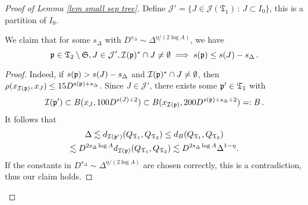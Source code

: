\begin{proof}[Proof of Lemma \ref{lem small sep tree}]
    Define $\mathcal{J}' = \{J \in \mathcal{J}(\mathfrak{T}_1) \, : \, J \subset I_0\}$, this is a partition of $I_0$.

    \begin{lemma}
        \label{lem sep aux 3}
        We claim that for some $s_\Delta$ with $D^{s_\Delta}\sim \Delta^{\eta/(2 \log A)}$, we have
        \begin{equation}
            \label{SepTreeClaim}
            \mathfrak p \in \mathfrak{T}_2 \setminus \mathfrak{S}, J \in \mathcal{J}', \mathcal{I}(\mathfrak p)^* \cap J \neq \emptyset \implies s(\mathfrak p) \leq s(J) - s_\Delta\,.
        \end{equation}
    \end{lemma}

    \begin{proof}
        Indeed, if $s(\mathfrak p) > s(J) - s_\Delta$ and $\mathcal{I}(\mathfrak p)^* \cap J \neq \emptyset$, then $\rho(x_{\mathcal{I}(\mathfrak p)}, x_J) \leq 15 D^{s(\mathfrak p) + s_\Delta}$. Since $J \in \mathcal{J}'$, there exists some $\mathfrak p' \in \mathfrak{T}_1$ with
        $$
            \mathcal{I}(\mathfrak p') \subset B(x_J, 100 D^{s(J) + 2}) \subset B(x_{\mathcal{I}(\mathfrak p)}, 200 D^{s(\mathfrak p) + s_\Delta + 2}) =: B\,.
        $$
        It follows that
        \begin{multline*}
            \Delta \lesssim d_{\mathcal{I}(\mathfrak p')}(Q_{\mathfrak{T}_1}, Q_{\mathfrak{T}_2})
            \leq d_{B}(Q_{\mathfrak{T}_1}, Q_{\mathfrak{T}_2})\\
            \lesssim D^{2 s_\Delta  \log A } d_{\mathcal{I}(\mathfrak p)}(Q_{\mathfrak{T}_1}, Q_{\mathfrak{T}_2})\lesssim D^{ 2 s_\Delta \log A} \Delta^{1 - \eta}.
        \end{multline*}
        If the constants in $D^{s_\Delta}\sim \Delta^{\eta/(2 \log A)}$ are chosen correctly, this is a contradiction, thus our claim holds.
    \end{proof}


\end{proof}
